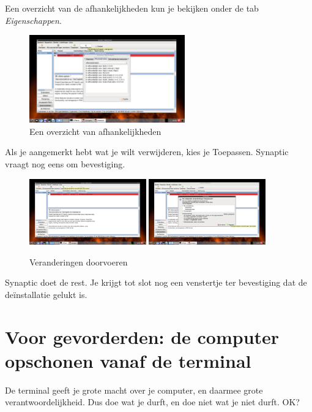 \documentclass[12pt,a4paper]{article}
\begin{document}
\noindent Een overzicht van de afhankelijkheden kun je bekijken onder de tab \emph{Eigenschappen}.  

\begin{figure} [H]
\centering
\includegraphics[width=0.6\textwidth]{plaatje18}
\caption{Een overzicht van afhankelijkheden}
\label{plaatje18}
\end{figure}

\noindent Als je aangemerkt hebt wat je wilt verwijderen, kies je Toepassen. Synaptic vraagt nog eens om bevestiging.  

\begin{figure} [H]
\centering
\includegraphics[width=0.45\textwidth]{plaatje19}
\includegraphics[width=0.45\textwidth]{plaatje20}
\caption{Veranderingen doorvoeren}
\label{plaatje19}
\end{figure}

\noindent Synaptic doet de rest. Je krijgt tot slot nog een venstertje ter bevestiging dat de de\"{i}nstallatie gelukt is.

\clearpage

\section{Voor gevorderden: de computer opschonen vanaf de terminal}

De terminal geeft je grote macht over je computer, en daarmee grote verantwoordelijkheid. Dus doe wat je durft, en doe niet wat je niet durft. OK?
\end{document}
